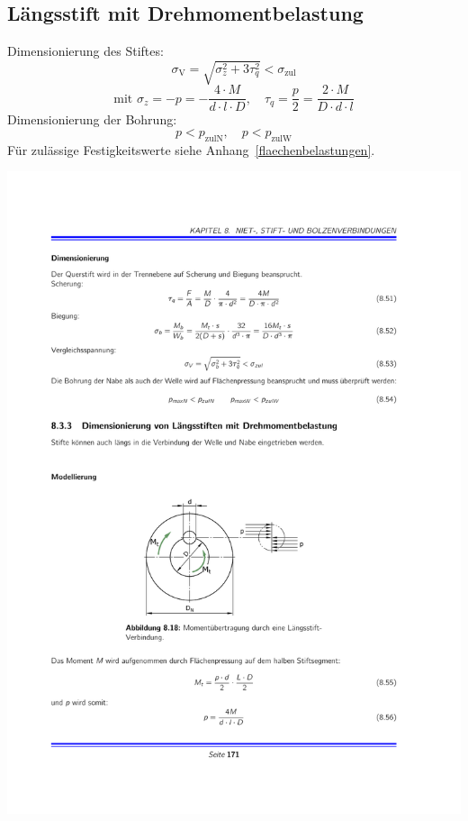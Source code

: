 	\subsection{Längsstift mit Drehmomentbelastung} %
		Dimensionierung des Stiftes:
		\begin{equation*}
			\sigma_{\text{V}} = \sqrt{\sigma_z^2 + 3 \tau_q^2} < \sigma_{\text{zul}}
		\end{equation*}
		\begin{equation*}
			\text{mit } \sigma_z = -p = -\frac{4 \cdot M}{d \cdot l \cdot D}, \quad \tau_q = \frac{p}{2} = \frac{2 \cdot M}{D \cdot d \cdot l}
		\end{equation*}
		Dimensionierung der Bohrung:
		\begin{equation*}
			p < p_{\text{zulN}}, \quad p< p_{\text{zulW}}
		\end{equation*}
		Für zulässige Festigkeitswerte siehe Anhang~\ref{flaechenbelastungen}.
		\begin{center}
			\includegraphics[width=.75\columnwidth]{graphics/laengsstift_drehmom}
		\end{center}
